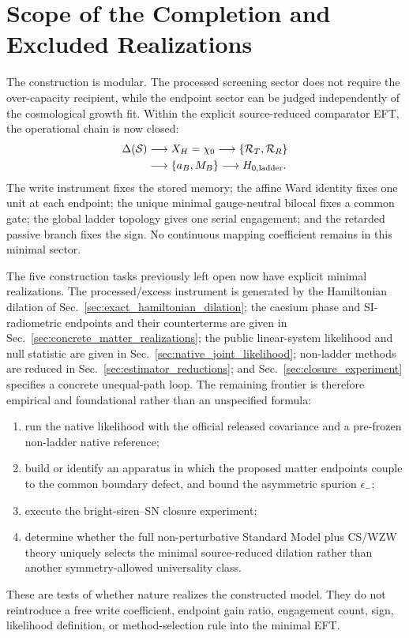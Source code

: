 \documentclass[aps,prd,twocolumn,10pt,superscriptaddress,nofootinbib]{revtex4-2}
\begin{document}
\section{Scope of the Completion and Excluded Realizations}
\label{sec:completion_tasks}

The construction is modular.  The processed screening sector does not
require the over-capacity recipient, while the endpoint sector can be
judged independently of the cosmological growth fit.  Within the explicit
source-reduced comparator EFT, the operational chain is now closed:
\begin{equation}
\begin{aligned}
 \Delta(\mathcal S)&\longrightarrow X_H=\chi_0
 \longrightarrow\{\mathcal R_T,\mathcal R_R\}\\
 &\longrightarrow\{a_B,M_B\}
 \longrightarrow H_{0,\rm ladder}.
\end{aligned}
 \label{eq:pb_completed_chain}
\end{equation}
The write instrument fixes the stored memory; the affine Ward identity fixes
one unit at each endpoint; the unique minimal gauge-neutral bilocal fixes a common gate;
the global ladder topology gives one serial engagement; and the retarded
passive branch fixes the sign.  No continuous mapping coefficient remains
in this minimal sector.

The five construction tasks previously left open now have explicit minimal
realizations.  The processed/excess instrument is generated by the
Hamiltonian dilation of Sec.~\ref{sec:exact_hamiltonian_dilation}; the
caesium phase and SI-radiometric endpoints and their counterterms are given
in Sec.~\ref{sec:concrete_matter_realizations}; the public linear-system
likelihood and null statistic are given in
Sec.~\ref{sec:native_joint_likelihood}; non-ladder methods are reduced in
Sec.~\ref{sec:estimator_reductions}; and
Sec.~\ref{sec:closure_experiment} specifies a concrete unequal-path loop.
The remaining frontier is therefore empirical and foundational rather than
an unspecified formula:
\begin{enumerate}
\item run the native likelihood with the official released covariance and a
pre-frozen non-ladder native reference;
\item build or identify an apparatus in which the proposed matter endpoints
couple to the common boundary defect, and bound the asymmetric spurion
$\epsilon_-$;
\item execute the bright-siren--SN closure experiment;
\item determine whether the full non-perturbative Standard Model plus
CS/WZW theory uniquely selects the minimal source-reduced dilation rather
than another symmetry-allowed universality class.
\end{enumerate}
These are tests of whether nature realizes the constructed model.  They do
not reintroduce a free write coefficient, endpoint gain ratio, engagement
count, sign, likelihood definition, or method-selection rule into the
minimal EFT.
\end{document}
